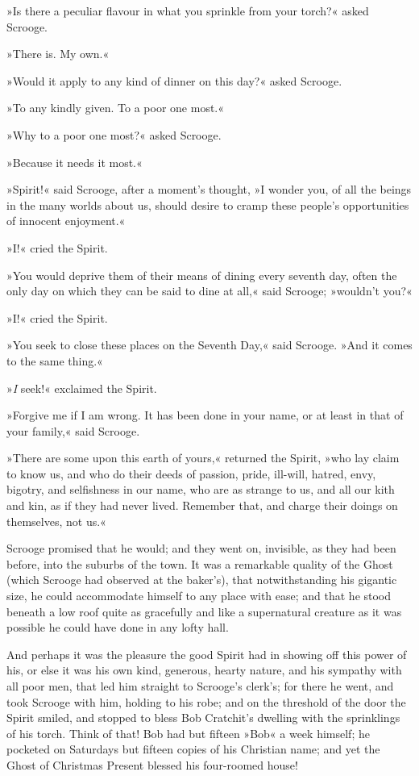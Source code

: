 »Is there a peculiar flavour in what you sprinkle from your torch?« asked Scrooge.

»There is. My own.«

»Would it apply to any kind of dinner on this day?« asked Scrooge.

»To any kindly given. To a poor one most.«

»Why to a poor one most?« asked Scrooge.

»Because it needs it most.«

»Spirit!« said Scrooge, after a moment's thought, »I wonder you, of all the beings in the many worlds about us, should desire to cramp these people's opportunities of innocent enjoyment.«

»I!« cried the Spirit.


»You would deprive them of their means of dining every seventh day, often the only day on which they can be said to dine at all,« said Scrooge; »wouldn't you?«

»I!« cried the Spirit.

»You seek to close these places on the Seventh Day,« said Scrooge. »And it comes to the same thing.«

»\textit{I} seek!« exclaimed the Spirit.

»Forgive me if I am wrong. It has been done in your name, or at least in that of your family,« said Scrooge.

»There are some upon this earth of yours,« returned the Spirit, »who lay claim to know us, and who do their deeds of passion, pride, ill-will, hatred, envy, bigotry, and selfishness in our name, who are as strange to us, and all our kith and kin, as if they had never lived. Remember that, and charge their doings on themselves, not us.«


Scrooge promised that he would; and they went on, invisible, as they had been before, into the suburbs of the town. It was a remarkable quality of the Ghost (which Scrooge had observed at the baker's), that notwithstanding his gigantic size, he could accommodate himself to any place with ease; and that he stood beneath a low roof quite as gracefully and like a supernatural creature as it was possible he could have done in any lofty hall.



And perhaps it was the pleasure the good Spirit had in showing off this power of his, or else it was his own kind, generous, hearty nature, and his sympathy with all poor men, that led him straight to Scrooge's clerk's; for there he went, and took Scrooge with him, holding to his robe; and on the threshold of the door the Spirit smiled, and stopped to bless Bob Cratchit's dwelling with the sprinklings of his torch. Think of that! Bob had but fifteen »Bob« a week himself; he pocketed on Saturdays but fifteen copies of his Christian name; and yet the Ghost of Christmas Present blessed his four-roomed house!



